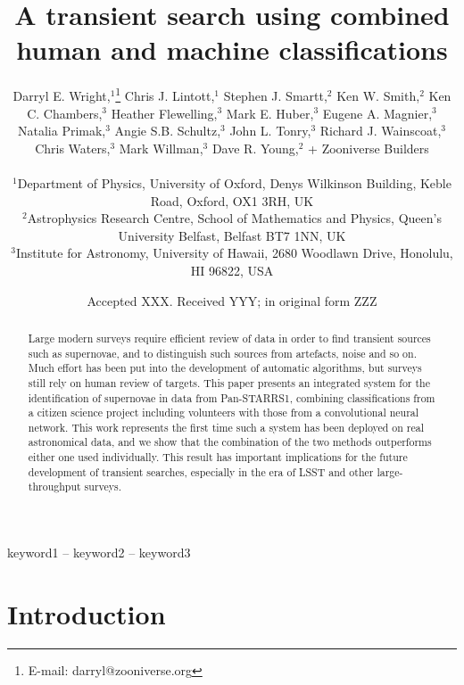 \documentclass[a4paper,fleqn,usenatbib]{mnras}
\title[Human and machine classifications]{A transient search using combined human and machine classifications}
\author[D. Wright, C. Lintott, K. W. Smith et al.]{Darryl E. Wright,$^{1}$\thanks{E-mail: darryl@zooniverse.org}
Chris J. Lintott,$^{1}$
Stephen J. Smartt,$^{2}$
Ken W. Smith,$^{2}$\newauthor
Ken C. Chambers,$^{3}$
Heather Flewelling,$^{3}$
Mark E. Huber,$^{3}$
Eugene A. Magnier,$^{3}$\newauthor
Natalia Primak,$^{3}$
Angie S.B. Schultz,$^{3}$
John L. Tonry,$^{3}$
Richard J. Wainscoat,$^{3}$\newauthor
Chris Waters,$^{3}$
Mark Willman,$^{3}$
Dave R.  Young,$^{2}$
+ Zooniverse Builders\\
\\
$^{1}$Department of Physics, University of Oxford, Denys Wilkinson Building, Keble Road, Oxford, OX1 3RH, UK \\
$^{2}$Astrophysics Research Centre, School of Mathematics and Physics, Queen’s University Belfast, Belfast BT7 1NN, UK \\
$^{3}$Institute for Astronomy, University of Hawaii, 2680 Woodlawn Drive, Honolulu, HI 96822, USA \\
}
\date{Accepted XXX. Received YYY; in original form ZZZ}
\begin{document}
\label{firstpage}
\pagerange{\pageref{firstpage}--\pageref{lastpage}}
\maketitle

\begin{abstract}
Large modern surveys require efficient review of data in order to find transient sources such as supernovae, and to distinguish such sources from artefacts, noise and so on. Much effort has been put into the development of automatic algorithms, but surveys still rely on human review of targets. This paper presents an integrated system for the identification of supernovae in data from Pan-STARRS1, combining classifications from a citizen science project including volunteers with those from a convolutional neural network. This work represents the first time such a system has been deployed on real astronomical data, and we show that the combination of the two methods outperforms either one used individually. This result has important implications for the future development of transient searches, especially in the era of LSST and other large-throughput surveys. 
\end{abstract}

\begin{keywords}
keyword1 -- keyword2 -- keyword3
\end{keywords}



\section{Introduction}
\end{document}
